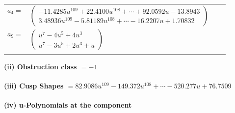 \documentclass[1p]{elsarticle_modified}
\theoremstyle{definition}
\begin{document}
\begin{tabular}{m{7pt} m{180pt} m{7pt} m{180pt} }
\flushright $a_{4}=$&$\begin{pmatrix}-11.4285 u^{109}+22.4100 u^{108}+\cdots+92.0592 u-13.8943\\3.48936 u^{109}-5.81189 u^{108}+\cdots-16.2207 u+1.70832\end{pmatrix}$ \\
\flushright $a_{9}=$&$\begin{pmatrix}u^7-4 u^5+4 u^3\\u^7-3 u^5+2 u^3+u\end{pmatrix}$\\&\end{tabular}
\flushleft \textbf{(ii) Obstruction class $= -1$}\\~\\
\flushleft \textbf{(iii) Cusp Shapes $= 82.9086 u^{109}-149.372 u^{108}+\cdots-520.277 u+76.7509$}\\~\\
\newpage\renewcommand{\arraystretch}{1}
\flushleft \textbf{(iv) u-Polynomials at the component}\newline \\
\end{document}
